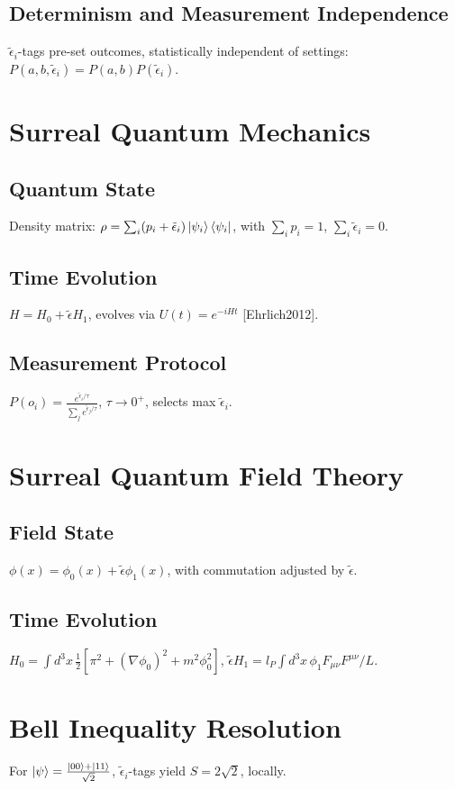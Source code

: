 \documentclass{article}
\begin{document}
\subsection{Determinism and Measurement Independence}
\(\tilde{\epsilon}_i\)-tags pre-set outcomes, statistically independent of settings: \(P(a, b, \tilde{\epsilon}_i) = P(a, b) P(\tilde{\epsilon}_i)\).

\section{Surreal Quantum Mechanics}
\subsection{Quantum State}
Density matrix: \(\rho = \sum_i (p_i + \tilde{\epsilon}_i) \ket{\psi_i}\bra{\psi_i}\), with \(\sum_i p_i = 1\), \(\sum_i \tilde{\epsilon}_i = 0\).

\subsection{Time Evolution}
\(H = H_0 + \tilde{\epsilon} H_1\), evolves via \(U(t) = e^{-i H t}\) [Ehrlich2012].

\subsection{Measurement Protocol}
\(P(o_i) = \frac{e^{\tilde{\epsilon}_i / \tau}}{\sum_j e^{\tilde{\epsilon}_j / \tau}}\), \(\tau \to 0^+\), selects max \(\tilde{\epsilon}_i\).

\section{Surreal Quantum Field Theory}
\subsection{Field State}
\(\phi(x) = \phi_0(x) + \tilde{\epsilon} \phi_1(x)\), with commutation adjusted by \(\tilde{\epsilon}\).

\subsection{Time Evolution}
\(H_0 = \int d^3x \, \frac{1}{2} [\pi^2 + (\nabla \phi_0)^2 + m^2 \phi_0^2]\), \(\tilde{\epsilon} H_1 = l_P \int d^3x \, \phi_1 F_{\mu\nu} F^{\mu\nu} / L\).

\section{Bell Inequality Resolution}
For \(\ket{\psi} = \frac{\ket{00} + \ket{11}}{\sqrt{2}}\), \(\tilde{\epsilon}_i\)-tags yield \(S = 2\sqrt{2}\), locally.
\end{document}
